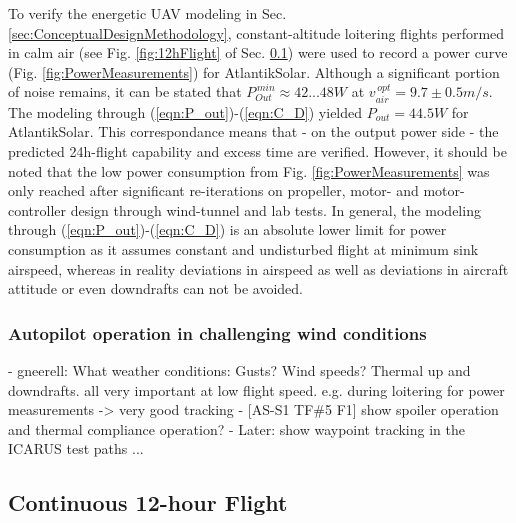 To verify the energetic UAV modeling in Sec. \ref{sec:ConceptualDesignMethodology}, constant-altitude loitering flights performed in calm air (see Fig. \ref{fig:12hFlight} of Sec. \ref{sec:12hFlight}) were used to record a power curve (Fig. \ref{fig:PowerMeasurements}) for AtlantikSolar. Although a significant portion of noise remains, it can be stated that $P_{Out}^{\,min}\approx42...48W$ at $v_{air}^{\,opt}=9.7\pm0.5m/s$. The modeling through (\ref{eqn:P_out})-(\ref{eqn:C_D}) yielded $P_{out}=44.5W$ for AtlantikSolar. This correspondance means that - on the output power side - the predicted 24h-flight capability and excess time are verified. However, it should be noted that the low power consumption from Fig. \ref{fig:PowerMeasurements} was only reached after significant re-iterations on propeller, motor- and motor-controller design through wind-tunnel and lab tests. In general, the modeling through (\ref{eqn:P_out})-(\ref{eqn:C_D}) is an absolute lower limit for power consumption as it assumes constant and undisturbed flight at minimum sink airspeed, whereas in reality deviations in airspeed as well as deviations in aircraft attitude or even downdrafts can not be avoided.

\subsubsection{Autopilot operation in challenging wind conditions}
	- gneerell: What weather conditions: Gusts? Wind speeds? Thermal up and downdrafts. all very important at low flight speed.
	e.g. during loitering for power measurements -> very good tracking
	- [AS-S1 TF\#5 F1] show spoiler operation and thermal compliance operation?
	- Later: show waypoint tracking in the ICARUS test paths ...  

\subsection{Continuous 12-hour Flight} \label{sec:12hFlight}
  
